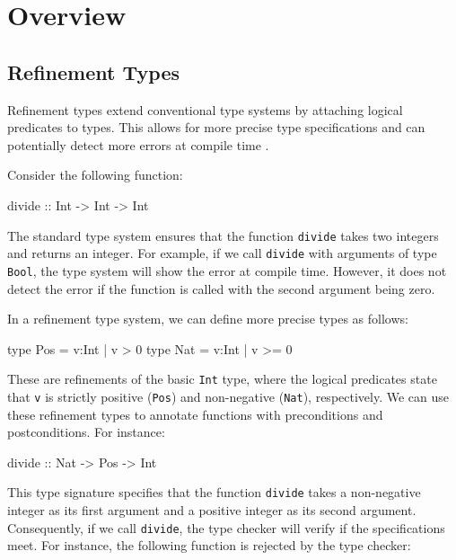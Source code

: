 \documentclass[]{rptuseminar}
\begin{document}

\section{Overview}
\label{sec:background}

\subsection{Refinement Types}  
Refinement types extend conventional type systems by attaching logical predicates to types.
This allows for more precise type specifications and can potentially detect more errors 
at compile time \cite{vazou_refinement_2014}.

Consider the following function:

\begin{haskell}  
divide :: Int -> Int -> Int  
\end{haskell} 

The standard type system ensures that the function \texttt{divide} takes two integers and 
returns an integer. For example, if we call \texttt{divide} with arguments of type 
\texttt{Bool}, the type system will show the error at compile time. 
However, it does not detect the error if the function is called with the second 
argument being zero.

In a refinement type system, we can define more precise types as follows: 

\begin{haskell}  
type Pos = {v:Int | v > 0}  
type Nat = {v:Int | v >= 0}  
\end{haskell}  

These are refinements of the basic \texttt{Int} type, where the logical predicates state 
that \texttt{v} is strictly positive (\texttt{Pos}) and non-negative (\texttt{Nat}), 
respectively. We can use these refinement types to annotate functions with 
preconditions and postconditions. For instance:

\begin{haskell}  
divide :: Nat -> Pos -> Int  
\end{haskell}  

This type signature specifies that the function \texttt{divide} takes a non-negative 
integer as its first argument and a positive integer as its second argument. Consequently, if we call
\texttt{divide}, the type checker will verify if the specifications meet.
For instance, the following function is rejected by the type checker:
\end{document}
